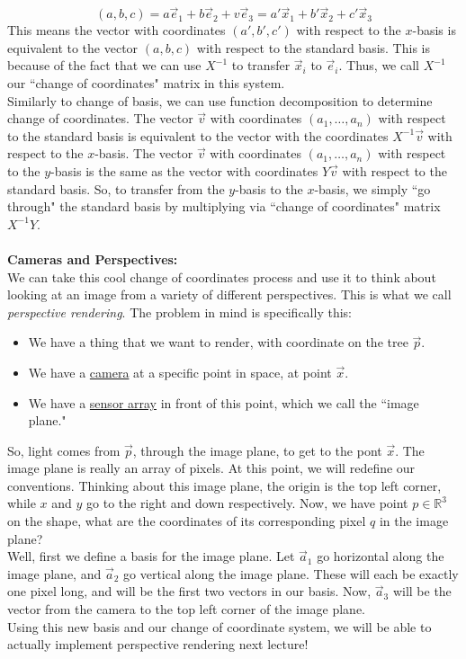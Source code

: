 \documentclass[12pt]{amsart}
\begin{document}
\[(a,b,c) = a\vec{e}_1 + b\vec{e}_2 + v\vec{e}_3 = a'\vec{x}_1 + b'\vec{x}_2 + c'\vec{x}_3\]
This means  the vector with coordinates $(a', b', c')$ with respect to the $x$-basis is equivalent to the vector $(a,b,c)$ with respect to the standard basis. This is because of the fact that we can use $X^{-1}$ to transfer $\vec{x}_i$ to $\vec{e}_i$. Thus, we call $X^{-1}$ our ``change of coordinates" matrix in this system.\\
Similarly to change of basis, we can use function decomposition to determine change of coordinates. The vector $\vec{v}$ with coordinates $(a_1, \dots, a_n)$ with respect to the standard basis is equivalent to the vector with the coordinates $X^{-1}\vec{v}$ with respect to the $x$-basis. The vector $\vec{v}$ with coordinates $(a_1, \dots, a_n)$ with respect to the $y$-basis is the same as the vector with coordinates $Y\vec{v}$ with respect to the standard basis. So, to transfer from the $y$-basis to the $x$-basis, we simply ``go through" the standard basis by multiplying via ``change of coordinates" matrix $X^{-1}Y$.\\ \\
\textbf{Cameras and Perspectives:}\\
We can take this cool change of coordinates process and use it to think about looking at an image from a variety of different perspectives. This is what we call \textit{perspective rendering}. The problem in mind is specifically this:
\begin{itemize}
	\item We have a thing that we want to render, with coordinate on the tree $\vec{p}$.
	\item We have a \underline{camera} at a specific point in space, at point $\vec{x}$.
	\item We have a \underline{sensor array} in front of this point, which we call the ``image plane."
\end{itemize}
So, light comes from $\vec{p}$, through the image plane, to get to the pont $\vec{x}$. The image plane is really an array of pixels. At this point, we will redefine our conventions. Thinking about this image plane, the origin is the top left corner, while $x$ and $y$ go to the right and down respectively. Now, we have point $p\in\mathbb{R}^3$ on the shape, what are the coordinates of its corresponding pixel $q$ in the image plane?\\
Well, first we define a basis for the image plane. Let $\vec{a}_1$ go horizontal along the image plane, and $\vec{a}_2$ go vertical along the image plane. These will each be exactly one pixel long, and will be the first two vectors in our basis. Now, $\vec{a}_3$ will be the vector from the camera to the top left corner of the image plane.\\
Using this new basis and our change of coordinate system, we will be able to actually implement perspective rendering next lecture!
\end{document}
